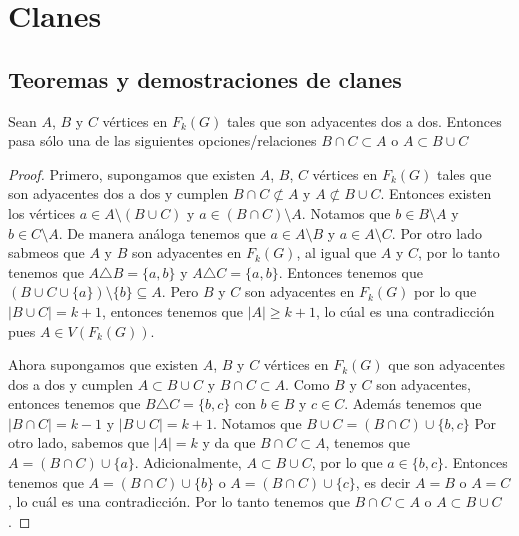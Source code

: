 \chapter{Clanes}%
\label{cap:ejemplos}

\section{Teoremas y demostraciones de clanes}%
\label{sec:etiquetas}


\begin{lema}%
        \label{lem:primero}
        Sean $A$, $B$ y $C$ v\'ertices en $F_k(G)$ tales que son adyacentes
        dos a dos. Entonces pasa s\'olo una de las siguientes
        opciones/relaciones $B \cap C \subset A$ o $A \subset B \cup C$
        \end{lema}

    
    \begin{proof}
        Primero, supongamos que existen $A$, $B$, $C$ v\'ertices en $F_k(G)$
        tales que son adyacentes dos a dos y cumplen $B \cap C \not\subset A$ y
        $A \not\subset B \cup C$. Entonces existen los v\'ertices  $a \in A
        \setminus (B \cup C)$ y $a \in (B \cap C)\setminus A$. Notamos que $b
        \in B \setminus A$ y $b \in C \setminus A$. De manera an\'aloga tenemos
        que $a \in A \setminus B$ y $a \in A \setminus C$. Por otro lado sabmeos
        que $A$ y $B$ son adyacentes en $F_k(G)$, al igual que $A$ y $C$, por lo
        tanto tenemos que $A \triangle B = \{a,b\}$ y $A \triangle C = \{a,
        b\}$. Entonces tenemos que $(B \cup C \cup \{a\})\setminus \{b\}
        \subseteq A$. Pero $B$ y $C$ son adyacentes en $F_k(G)$ por lo que $|B
        \cup C| = k+1$, entonces tenemos que $|A| \geq k+1$, lo c\'ual es una
        contradicci\'on pues $A \in V (F_k(G))$. 

        Ahora supongamos que existen $A$, $B$ y $C$ v\'ertices en $F_k(G)$ que
        son adyacentes dos a dos y cumplen $A \subset B \cup C$ y $B \cap C
        \subset A$. Como $B$ y $C$ son adyacentes, entonces tenemos que $B
        \triangle C = \{b,c\}$ con $b \in B$ y $c \in C$. Adem\'as tenemos que
        $|B \cap C| = k-1$ y $|B \cup C| = k +1$. Notamos que $B \cup C = (B\cap
        C) \cup \{b,c\}$ Por otro lado, sabemos que $|A|=k$ y da que $B \cap C
        \subset A$, tenemos que $A = (B \cap C) \cup \{a\}$. Adicionalmente, $A
        \subset B \cup C$, por lo que $a \in \{b, c\}$. Entonces tenemos que $A
        = (B \cap C) \cup \{b\}$ o $A = (B \cap C) \cup \{c\}$, es decir $A = B$
        o $A=C$, lo cu\'al es una contradicci\'on. Por lo tanto tenemos que $B
        \cap C \subset A$ o $A \subset B \cup C$.
    \end{proof}

